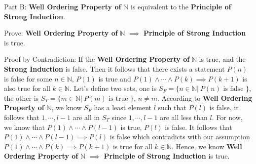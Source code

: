 \begin{flushleft}
Part B: \textbf{Well Ordering Property of} $\mathbb{N}$ is equivalent to the 
\textbf{Principle of Strong Induction}. \\
\vspace{10px}

Prove: \textbf{Well Ordering Property of} $\mathbb{N}$ $\implies$ 
\textbf{Principle of Strong Induction} is true. \\
\vspace{10px}

Proof by Contradiction: If the \textbf{Well Ordering Property of} $\mathbb{N}$ 
is true, and the \textbf{Strong Induction} is false. Then it follows that there 
exists a statement $P(n)$ is false for some $n \in \mathbb{N}$, $P(1)$ is true 
and $P(1) \land \cdots \land P(k) \implies P(k + 1)$ is also true for all $k \in 
\mathbb{N}$. Let's define two sets, one is $S_F = \{n \in \mathbb{N} |\ 
P(n) \text{ is false } \}$, the other is $S_T = \{m \in \mathbb{N}  |\ P(m)
 \text{ is true } \}$, $n \ne m$. According to \textbf{Well Ordering Property of} 
$\mathbb{N}$, we know $S_F$ has a least element $l$ such that $P(l)$ is false, 
it follows that $ 1, \cdots, l - 1$ are all in $S_T$ since $1, \cdots, 
l - 1$ are all less than $l$. For now, we know that $P(1) \land \cdots \land 
P(l - 1)$ is true,  $P(l)$ is false. It follows that $P(1) \land \cdots \land 
P(l - 1) \implies P(l)$ is false which contradicts with our assumption $P(1) 
\land \cdots \land P(k) \implies P(k + 1)$ is true for all $k \in 
\mathbb{N}$. Hence, we know \textbf{Well Ordering Property of} $\mathbb{N}$ 
$\implies$ \textbf{Principle of Strong Induction} is true.
\end{flushleft}

